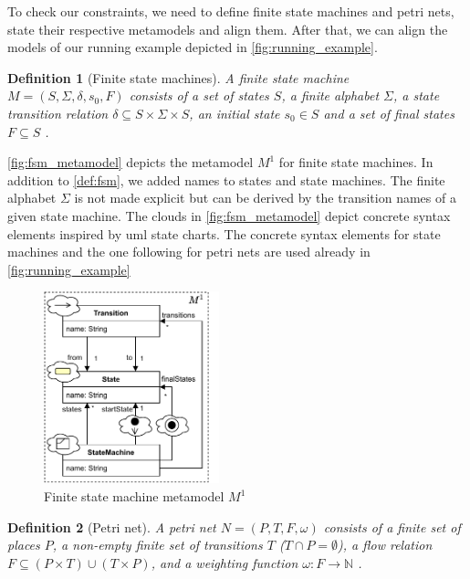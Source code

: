 \documentclass[conference]{IEEEtran}
\newtheorem{definition}{Definition}
\begin{document}
To check our constraints, we need to define finite state machines and petri nets, state their respective metamodels and align them.
After that, we can align the models of our running example depicted in \autoref{fig:running_example}.

\begin{definition}[Finite state machines] \label{def:fsm}
    A finite state machine $M=(S, \Sigma, \delta, s_0, F)$ consists of a set of states $S$, a finite alphabet $\Sigma$, a state transition relation $\delta \subseteq S \times \Sigma \times S$, an initial state $s_0 \in S$ and a set of final states $F \subseteq S$ \cite{kunzeBehaviouralModelsModelling2016}. %
\end{definition}

\autoref{fig:fsm_metamodel} depicts the metamodel $M^1$ for finite state machines.
In addition to \autoref{def:fsm}, we added names to states and state machines.
The finite alphabet $\Sigma$ is not made explicit but can be derived by the transition names of a given state machine.
The clouds in \autoref{fig:fsm_metamodel} depict concrete syntax elements inspired by \gls{uml} state charts.
The concrete syntax elements for state machines and the one following for petri nets are used already in \autoref{fig:running_example}

\begin{figure}[h]
    \centering
    \includegraphics[width=2in]{state_machine_metamodel}
    \caption{Finite state machine metamodel $M^1$}
    \label{fig:fsm_metamodel}
\end{figure}

\begin{definition}[Petri net] \label{def:pn}
    A petri net $N=(P,T,F, \omega)$ consists of a finite set of places $P$, a non-empty finite set of transitions $T$ ($T \cap P = \emptyset $), a flow relation $F \subseteq (P \times T) \cup (T \times P)$, and a weighting function $\omega: F \to \mathbb{N}$ \cite{kunzeBehaviouralModelsModelling2016}. %
\end{definition}
\end{document}
